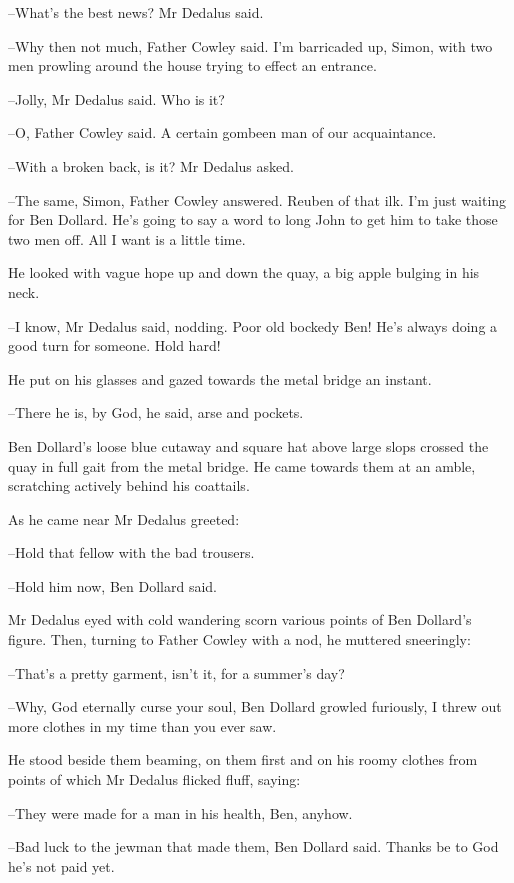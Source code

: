 --What's the best news?
Mr Dedalus said.

--Why then not much,
Father Cowley said.
I'm barricaded up, Simon,
with
two men prowling around the house
trying to effect an entrance.

--Jolly,
Mr Dedalus said.
Who is it?

--O,
Father Cowley said.
A certain gombeen man of our acquaintance.

--With a broken back, is it?
Mr Dedalus asked.

--The same, Simon,
Father Cowley answered.
Reuben of that ilk.
I'm just
waiting for Ben Dollard.
He's going to say a word to long John
to get him
to take those two men off.
All I want is a little time.

He looked with vague hope up and down the quay,
a big apple bulging in
his neck.

--I know,
Mr Dedalus said, nodding.
Poor old bockedy Ben!
He's always
doing a good turn for someone.
Hold hard!

He put on his glasses
and gazed towards the metal bridge an instant.

--There he is, by God, he said,
arse and pockets.

Ben Dollard's loose blue cutaway and square hat above large slops
crossed
the quay in full gait
from the metal bridge.
He came towards them at an
amble,
scratching actively behind his coattails.

As he came near
Mr Dedalus greeted:

--Hold that fellow with the bad trousers.

--Hold him now,
Ben Dollard said.

Mr Dedalus eyed with cold wandering scorn
various points of Ben Dollard's
figure.
Then,
turning to Father Cowley with a nod,
he muttered
sneeringly:

--That's a pretty garment, isn't it,
for a summer's day?

--Why, God eternally curse your soul,
Ben Dollard growled furiously,
I
threw out more clothes in my time than you ever saw.

He stood beside them beaming,
on them first and on his roomy clothes
from
points of which Mr Dedalus flicked fluff,
saying:

--They were made for a man in his health, Ben, anyhow.

--Bad luck to the jewman that made them,
Ben Dollard said.
Thanks be to
God he's not paid yet.

